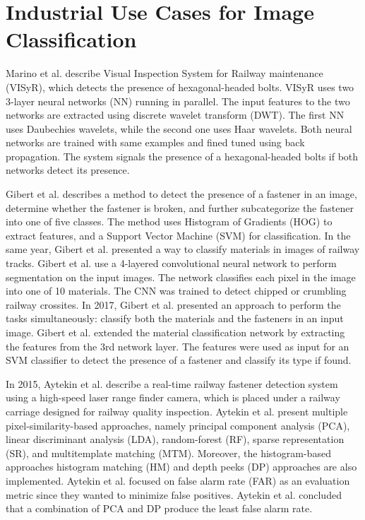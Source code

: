 \section{Industrial Use Cases for Image Classification}\label{sec:industrial_usecases}

Marino et al. \cite{marino2007real} \cite{de2009gpu} describe Visual Inspection System for Railway maintenance (VISyR), which detects the presence of hexagonal-headed bolts. VISyR uses two 3-layer neural networks (NN) running in parallel. The input features to the two networks are extracted using discrete wavelet transform (DWT). The first NN uses Daubechies wavelets, while the second one uses Haar wavelets. Both neural networks are trained with same examples and fined tuned using back propagation. The system signals the presence of a hexagonal-headed bolts if both networks detect its presence. 

Gibert et al. \cite{gibert2015robust} describes a method to detect the presence of a fastener in an image, determine whether the fastener is broken, and further subcategorize the fastener into one of five classes. The method uses Histogram of Gradients (HOG) to extract features, and a Support Vector Machine (SVM) for classification. In the same year, Gibert et al. \cite{gibert2015material} presented a way to classify materials in images of railway tracks. Gibert et al. use a 4-layered convolutional neural network to perform segmentation on the input images. The network classifies each pixel in the image into one of 10 materials. The CNN was trained to detect chipped or crumbling railway crossites. In 2017, Gibert et al. \cite{gibert2017deep} presented an approach to perform the tasks simultaneously: classify both the materials and the fasteners in an input image. Gibert et al. extended the material classification network \cite{gibert2015material} by extracting the features from the 3rd network layer. The features were used as input for an SVM classifier to detect the presence of a fastener and classify its type if found.

In 2015, Aytekin et al. \cite{aytekin2015railway} describe a real-time railway fastener detection system using a high-speed laser range finder camera, which is placed under a railway carriage designed for railway quality inspection. Aytekin et al. present multiple pixel-similarity-based approaches, namely principal component analysis (PCA), linear discriminant analysis (LDA), random-forest (RF), sparse representation (SR), and multitemplate matching (MTM). Moreover, the histogram-based approaches histogram matching (HM) and depth peeks (DP) approaches are also implemented. Aytekin et al. focused on false alarm rate (FAR) as an evaluation metric since they wanted to minimize false positives. Aytekin et al. concluded that a combination of PCA and DP produce the least false alarm rate.

